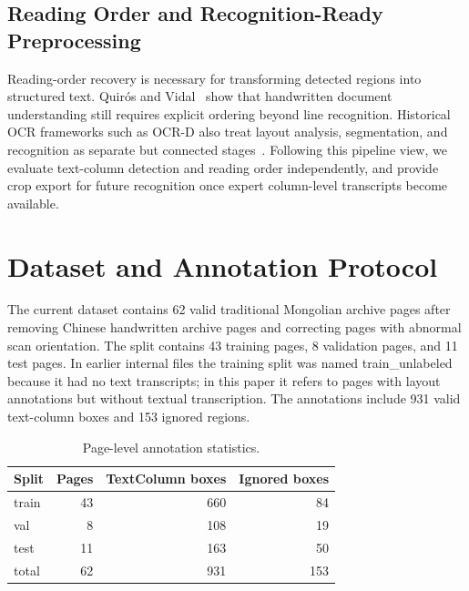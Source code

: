 \documentclass[12pt]{article}
\begin{document}
\subsection{Reading Order and Recognition-Ready Preprocessing}
Reading-order recovery is necessary for transforming detected regions into structured text. Quir\'os and Vidal~\cite{quiros2022reading} show that handwritten document understanding still requires explicit ordering beyond line recognition. Historical OCR frameworks such as OCR-D also treat layout analysis, segmentation, and recognition as separate but connected stages~\cite{neudecker2019ocrd}. Following this pipeline view, we evaluate text-column detection and reading order independently, and provide crop export for future recognition once expert column-level transcripts become available.

\section{Dataset and Annotation Protocol}
The current dataset contains 62 valid traditional Mongolian archive pages after removing Chinese handwritten archive pages and correcting pages with abnormal scan orientation. The split contains 43 training pages, 8 validation pages, and 11 test pages. In earlier internal files the training split was named train\_unlabeled because it had no text transcripts; in this paper it refers to pages with layout annotations but without textual transcription. The annotations include 931 valid text-column boxes and 153 ignored regions.

\begin{table}[t]
\centering
\caption{Page-level annotation statistics.}
\label{tab:data_stats}
\begin{tabular}{lrrr}
\toprule
Split & Pages & TextColumn boxes & Ignored boxes \\
\midrule
train & 43 & 660 & 84 \\
val & 8 & 108 & 19 \\
test & 11 & 163 & 50 \\
\midrule
total & 62 & 931 & 153 \\
\bottomrule
\end{tabular}
\end{table}
\end{document}
